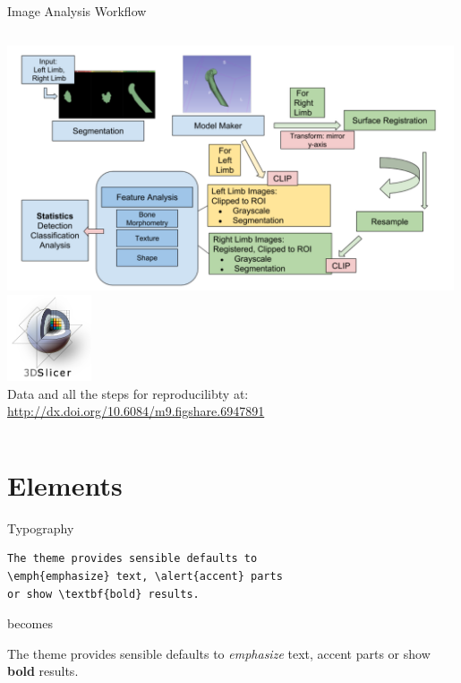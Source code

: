 \documentclass[10pt,aspectratio=169]{beamer}
\begin{document}
{
\begin{frame}{Image Analysis Workflow}
\begin{columns}[onlytextwidth]
        \includegraphics[width=0.99\textwidth]{figures/analysis_workflow.png}
        \centering
        \includegraphics[width=2.5cm]{logos/logo_slicer.png}\\
        \vspace{0.3cm}
        Data and all the steps for reproducilibty at: \url{http://dx.doi.org/10.6084/m9.figshare.6947891}
\end{columns}
\end{frame}
}

\section{Elements}

\begin{frame}[fragile]{Typography}
      \begin{verbatim}The theme provides sensible defaults to
\emph{emphasize} text, \alert{accent} parts
or show \textbf{bold} results.\end{verbatim}

  \begin{center}becomes\end{center}

  The theme provides sensible defaults to \emph{emphasize} text,
  \alert{accent} parts or show \textbf{bold} results.
\end{frame}
\end{document}
